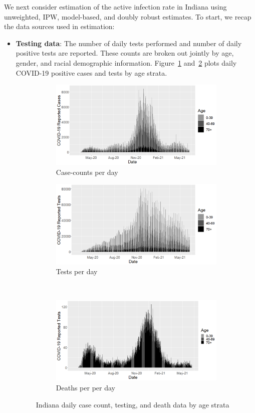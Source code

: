 \documentclass[11pt]{amsart}
\numberwithin{equation}{section}
\theoremstyle{plain}
\begin{document}
We next consider estimation of the active infection rate in Indiana using unweighted, IPW, model-based, and doubly robust estimates. To start, we recap the data sources used in estimation:
\begin{itemize}[leftmargin=*]
\item {\bf Testing data}:  The number of daily tests performed and number of daily positive tests are reported.  These counts are broken out jointly by age, gender, and racial demographic information.  Figure~\ref{fig:in-cases} and~\ref{fig:in-tests} plots daily COVID-19 positive cases and tests by age strata.

\begin{figure}
\centering
\begin{subfigure}{.45\textwidth}
 \centering
 \includegraphics[width=.9\linewidth]{../figs/indianacasecounts_byage.png}
 \caption{Case-counts per day}
 \label{fig:in-cases}
\end{subfigure}
\begin{subfigure}{.45\textwidth}
 \centering
 \includegraphics[width=.9\linewidth]{../figs/indianacovidtests_byage.png}
\caption{Tests per day}
\label{fig:in-tests}
\end{subfigure} \\ [1ex]
\begin{subfigure}{\linewidth}
\centering
\includegraphics[width=.45\linewidth]{../figs/indianadeaths_byage.png}
 \caption{Deaths per per day}
 \label{fig:in-deaths}
\end{subfigure}
\caption{Indiana daily case count, testing, and death data by age strata}
\end{figure}


\end{itemize}
\end{document}

